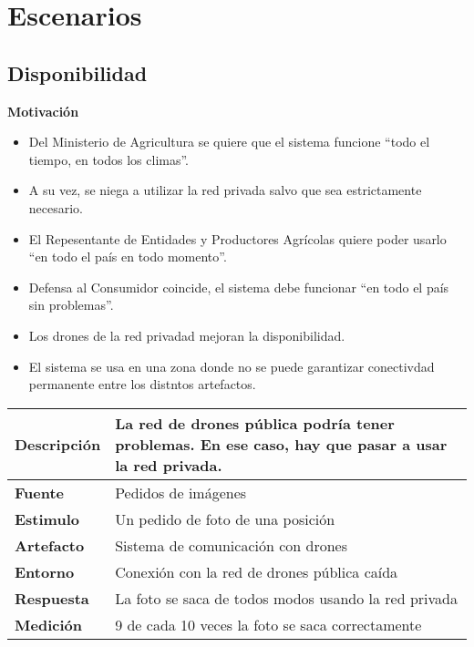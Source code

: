 \section{Escenarios}
\subsection{Disponibilidad}
\textbf{Motivación}
\begin{itemize}
 \item Del Ministerio de Agricultura se quiere que el sistema funcione ``todo el tiempo, en todos los climas''.
 \item A su vez, se niega a utilizar la red privada salvo que sea estrictamente necesario.
 \item El Repesentante de Entidades y Productores Agrícolas quiere poder usarlo ``en todo el país en todo momento''.
 \item Defensa al Consumidor coincide, el sistema debe funcionar ``en todo el país sin problemas''.
 \item Los drones de la red privadad mejoran la disponibilidad.
 \item El sistema se usa en una zona donde no se puede garantizar conectivdad permanente entre los distntos artefactos.
\end{itemize}


\begin{tabular}{| l || p{12cm} |}
\hline 
\textbf{Descripci\'on} & La red de drones pública podría tener problemas. En ese caso, hay que pasar a usar la red privada. \\
\hline 
\textbf{Fuente} & Pedidos de imágenes \\
\hline 
\textbf{Estimulo} & Un pedido de foto de una posición \\
\hline 
\textbf{Artefacto} & Sistema de comunicación con drones \\
\hline 
\textbf{Entorno} & Conexión con la red de drones pública caída \\
\hline 
\textbf{Respuesta} & La foto se saca de todos modos usando la red privada \\
\hline 
\textbf{Medici\'on} & 9 de cada 10 veces la foto se saca correctamente \\
\hline 
\end{tabular}

\medskip

